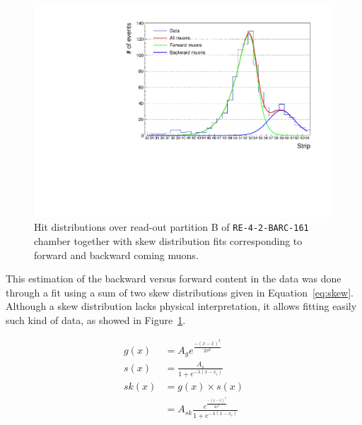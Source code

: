 	\begin{figure}
            \centering
		\includegraphics[width = \linewidth]{fig/chapt5/Cosmic-data-21-skew-fit.pdf}
		\caption{\label{fig:Fit-data} Hit distributions over read-out partition B of \texttt{RE-4-2-BARC-161} chamber together with skew distribution fits corresponding to forward and backward coming muons.}
	\end{figure}
	
	This estimation of the backward versus forward content in the data was done through a fit using a sum of two skew distributions given in Equation~\ref{eq:skew}. Although a skew distribution lacks physical interpretation, it allows fitting easily such kind of data, as showed in Figure~\ref{fig:Fit-data}.
	
	\begin{equation}
	\label{eq:skew}
		\begin{aligned}
	g(x) &= A_g e^{\frac{-(x-\bar{x})^2}{2\sigma^2}}\\
	s(x) &= \frac{A_s}{1+e^{-\lambda(x-x_i)}}\\
	sk(x) &= g(x)\times s(x)\\
	      &= A_{sk}\frac{e^{\frac{-(x-\bar{x})^2}{2\sigma^2}}}{1+e^{-\lambda(x-x_i)}}
		\end{aligned}
	\end{equation}

\endgroup
	

